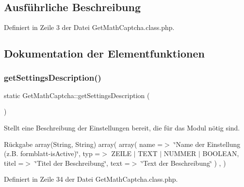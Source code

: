 \subsection{Ausführliche Beschreibung}


Definiert in Zeile 3 der Datei Get\+Math\+Captcha.\+class.\+php.



\subsection{Dokumentation der Elementfunktionen}
\mbox{\label{class_get_math_captcha_a5871298bb5783406f5a07d87f1b0d1af}} 
\subsubsection{\texorpdfstring{get\+Settings\+Description()}{getSettingsDescription()}\hspace{0.1cm}{\footnotesize\ttfamily [1/2]}}
{\footnotesize\ttfamily static Get\+Math\+Captcha\+::get\+Settings\+Description (\begin{DoxyParamCaption}{ }\end{DoxyParamCaption})\hspace{0.3cm}{\ttfamily [static]}}

Stellt eine Beschreibung der Einstellungen bereit, die für das Modul nötig sind. \begin{DoxyReturn}{Rückgabe}
array(\+String, String) array( array( \textquotesingle{}name\textquotesingle{} =$>$ \char`\"{}\+Name der Einstellung (z.\+B. formblatt-\/is\+Active)\char`\"{}, \textquotesingle{}typ\textquotesingle{} =$>$ Z\+E\+I\+LE $\vert$ T\+E\+XT $\vert$ N\+U\+M\+M\+ER $\vert$ B\+O\+O\+L\+E\+AN, \textquotesingle{}titel\textquotesingle{} =$>$ \char`\"{}\+Titel der Beschreibung\char`\"{}, \textquotesingle{}text\textquotesingle{} =$>$ \char`\"{}\+Text der Beschreibung\char`\"{} ) , ) 
\end{DoxyReturn}


Definiert in Zeile 34 der Datei Get\+Math\+Captcha.\+class.\+php.

\mbox{\label{class_get_math_captcha_a5871298bb5783406f5a07d87f1b0d1af}} 
